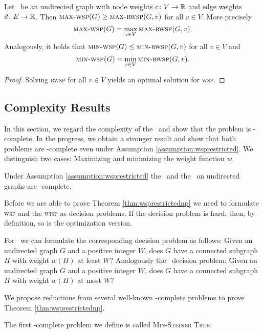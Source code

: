 \begin{lemma}
	\label{lemma:rwsp}
	Let \ugraph\ be an undirected graph with node weights $c\colon V \to \mathbb{R}$ and edge weights $d\colon E \to \mathbb{R}$. Then $\text{\textsc{max-wsp}}(G) \geq \text{\textsc{max-rwsp}}(G, v)$ for all $v \in V$. More precisely
	$$ \text{\textsc{max-wsp}}(G) = \max_{v \in V} \text{\textsc{max-rwsp}}(G, v).$$
	Analogously, it holds that $\text{\textsc{min-wsp}}(G) \leq \text{\textsc{min-rwsp}}(G, v)$ for all $v \in V$ and
	$$ \text{\textsc{min-wsp}}(G) = \min_{v \in V} \text{\textsc{min-rwsp}}(G, v).$$
\end{lemma}
\begin{proof}
	Solving \textsc{rwsp} for all $v \in V$ yields an optimal solution for \textsc{wsp}.
\end{proof}

\subsection{Complexity Results}
\label{sec:wsp:complexity}

In this section, we regard the complexity of the \WSP\ and show that the problem is \NP-complete. In the progress, we obtain a stronger result and show that both problems are \NP-complete even under Assumption \ref{assumption:wsprestricted}. We distinguish two cases: Maximizing and minimizing the weight function $w$.\medskip

\begin{theorem}
	\label{thm:wsprestrictednp}
	Under Assumption \ref{assumption:wsprestricted} the \WSP\ and the \WISP\ on undirected graphs are \NP-complete.
\end{theorem}

Before we are able to prove Theorem \ref{thm:wsprestrictednp} we need to formulate \textsc{wsp} and the \textsc{wisp} as decision problems. If the decision problem is hard, then, by definition, so is the optimization version.\medskip

For \maxWSP\ we can formulate the corresponding decision problem as follows: Given an undirected graph $G$ and a positive integer $W$, does $G$ have a connected subgraph $H$ with weight $w(H)$ at least $W$? Analogously the \minWSP\ decision problem: Given an undirected graph $G$ and a positive integer $W$, does $G$ have a connected subgraph $H$ with weight $w(H)$ at most $W$?\medskip

We propose reductions from several well-known \NP-complete problems to prove Theorem \ref{thm:wsprestrictednp}.\medskip

The first \NP-complete problem we define is called \textsc{Min-Steiner Tree}.

